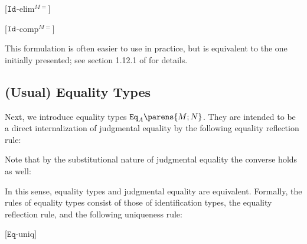 \documentclass[11pt]{article}
\begin{document}
\begin{prooftree*}
	[$\idtype$-elim$^{M=}$]{}
\end{prooftree*}
\begin{prooftree*}
	[$\idtype$-comp$^{M=}$]{}
\end{prooftree*}

This formulation is often easier to use in practice, but is equivalent to the one initially presented; see section 1.12.1 of \cite{hott-as:book} for details.

\subsection{(Usual) Equality Types}

Next, we introduce equality types $\mathtt{Eq}_A\parens{M; N}$. They are intended to be a direct internalization of judgmental equality by the following equality reflection rule:

\begin{prooftree*}
\end{prooftree*}

Note that by the substitutional nature of judgmental equality the converse holds as well:

\begin{prooftree*}
\end{prooftree*}

In this sense, equality types and judgmental equality are equivalent. Formally, the rules of equality types consist of those of identification types, the equality reflection rule, and the following uniqueness rule:

\begin{prooftree*}
	[$\mathtt{Eq}$-uniq]{}
\end{prooftree*}
\end{document}
